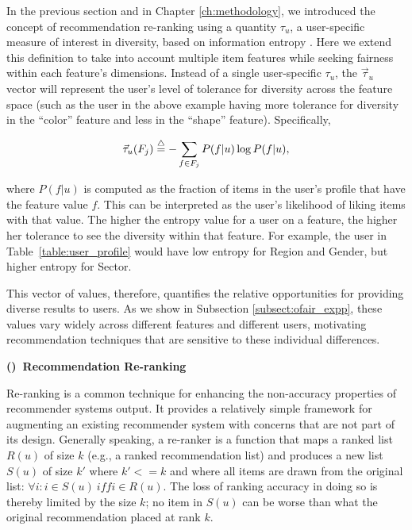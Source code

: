 In the previous section and in Chapter \ref{ch:methodology}, we introduced the concept of recommendation re-ranking using a quantity $\tau_u$, a user-specific measure of interest in diversity, based on information entropy \cite{liu2018personalizing,liu2019personalized}. Here we extend this definition to take into account multiple item features while seeking fairness within each feature's dimensions. Instead of a single user-specific $\tau_u$, the $\vec{\tau}_u$ vector will represent the user's level of tolerance for diversity across the feature space (such as the user in the above example having more tolerance for diversity in the ``color'' feature and less in the ``shape'' feature). Specifically,

\begin{equation}
\vec{\tau}_u(F_{j})\buildrel\triangle\over=-\sum_{f \in F_j} P(f|u)\log P(f|u),
\label{eq:tau}
\end{equation}
\vspace{0.25cm}

where $P(f|u)$ is computed as the fraction of items in the user's profile that have the feature value $f$. This can be interpreted as the user's likelihood of liking items with that value. The higher the entropy value for a user on a feature, the higher her tolerance to see the diversity within that feature. For example, the user in Table~\ref{table:user_profile} would have low entropy for Region and Gender, but higher entropy for Sector.

This vector of values, therefore, quantifies the relative opportunities for providing diverse results to users. As we show in Subsection \ref{subsect:ofair_expp}, these values vary widely across different features and different users, motivating recommendation techniques that are sensitive to these individual differences.

\vspace{0.25cm}
\noindent \textbf{()~Recommendation Re-ranking}
\vspace{0.25cm}

Re-ranking is a common technique for enhancing the non-accuracy properties of recommender systems output. It provides a relatively simple framework for augmenting an existing recommender system with concerns that are not part of its design. Generally speaking, a re-ranker is a function that maps a ranked list $R(u)$ of size $k$ (e.g., a ranked recommendation list) and produces a new list $S(u)$ of size $k'$ where $k'<= k$ and where all items are drawn from the original list: $\forall{i}: i \in S(u) ~\mathit{iff} i\in R(u)$. The loss of ranking accuracy in doing so is thereby limited by the size $k$; no item in $S(u)$ can be worse than what the original recommendation placed at rank $k$. 


